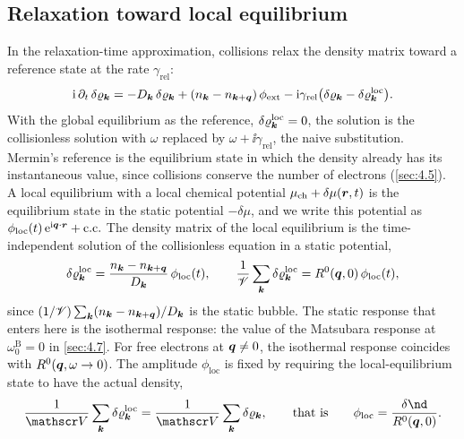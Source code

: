 \subsection*{Relaxation toward local equilibrium}

In the relaxation-time approximation, collisions relax the density matrix toward a reference state at the rate $\gamma_{\mathrm{rel}}$:
\begin{equation*}
  \mathrm{i}\,\partial_t\,\delta\varrho_{\bm{k}} = -D_{\bm{k}}\,\delta\varrho_{\bm{k}} + (n_{\bm{k}} - n_{\bm{k}+\bm{q}})\,\phi_{\mathrm{ext}} - \mathrm{i}\gamma_{\mathrm{rel}}\bigl(\delta\varrho_{\bm{k}} - \delta\varrho^{\mathrm{loc}}_{\bm{k}}\bigr) .
\end{equation*}
With the global equilibrium as the reference, $\delta\varrho^{\mathrm{loc}}_{\bm{k}} = 0$, the solution is the collisionless solution with $\omega$ replaced by $\omega + \ii\gamma_{\mathrm{rel}}$, the naive substitution. Mermin's reference is the equilibrium state in which the density already has its instantaneous value, since collisions conserve the number of electrons (\cref{sec:4.5}). A local equilibrium with a local chemical potential $\mu_{\mathrm{ch}} + \delta\mu(\bm{r}, t)$ is the equilibrium state in the static potential $-\delta\mu$, and we write this potential as $\phi_{\mathrm{loc}}(t)\,\mathrm{e}^{\mathrm{i}\bm{q}\cdot\bm{r}} + \text{c.c.}$ The density matrix of the local equilibrium is the time-independent solution of the collisionless equation in a static potential,
\begin{equation*}
  \delta\varrho^{\mathrm{loc}}_{\bm{k}} = \frac{n_{\bm{k}} - n_{\bm{k}+\bm{q}}}{D_{\bm{k}}}\,\phi_{\mathrm{loc}}(t), \qquad
  \frac{1}{\mathscr{V}}\sum_{\bm{k}}\delta\varrho^{\mathrm{loc}}_{\bm{k}} = R^0(\bm{q},0)\,\phi_{\mathrm{loc}}(t) ,
\end{equation*}
since $(1/\mathscr{V})\sum_{\bm{k}}(n_{\bm{k}} - n_{\bm{k}+\bm{q}})/D_{\bm{k}}$ is the static bubble. The static response that enters here is the isothermal response: the value of the Matsubara response at $\omega^{\mathrm{B}}_0 = 0$ in \cref{sec:4.7}. For free electrons at $\bm{q} \ne 0$, the isothermal response coincides with $R^0(\bm{q},\omega \to 0)$. The amplitude $\phi_{\mathrm{loc}}$ is fixed by requiring the local-equilibrium state to have the actual density,
\begin{equation}
  \frac{1}{\Vol}\sum_{\vect{k}}\delta\varrho^{\mathrm{loc}}_{\vect{k}} = \frac{1}{\Vol}\sum_{\vect{k}}\delta\varrho_{\vect{k}} , \qquad\text{that is}\qquad
  \phi_{\mathrm{loc}} = \frac{\delta\nd}{R^0(\vect{q},0)} .
  \label{eq:D.9-condition}
\end{equation}

